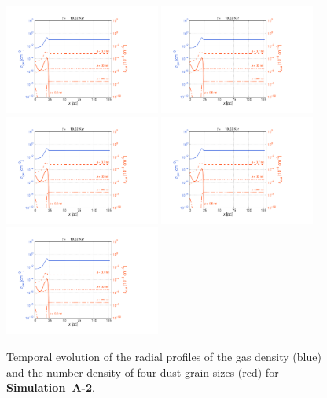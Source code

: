 \documentclass[fleqn,usenatbib]{mnras}
\begin{document}
  \begin{figure}
  \includegraphics[trim=2.4cm 1.5cm 9.0cm 2.0cm, clip=true,page=1,height = 3.6cm]{Pics/Pics_A2/Profile_dust.pdf}\hspace*{-0.05cm} 
  \includegraphics[trim=5.5cm 1.5cm 9.0cm 2.0cm, clip=true,page=2,height = 3.6cm]{Pics/Pics_A2/Profile_dust.pdf}\hspace*{-0.05cm} 
  \includegraphics[trim=5.5cm 1.5cm 9.0cm 2.0cm, clip=true,page=4,height = 3.6cm]{Pics/Pics_A2/Profile_dust.pdf}\hspace*{-0.05cm} 
  \includegraphics[trim=5.5cm 1.5cm 9.0cm 2.0cm, clip=true,page=5,height = 3.6cm]{Pics/Pics_A2/Profile_dust.pdf}\hspace*{-0.05cm} 
  \includegraphics[trim=5.5cm 1.5cm 6.0cm 2.0cm, clip=true,page=6,height = 3.6cm]{Pics/Pics_A2/Profile_dust.pdf}
  \caption{Temporal evolution of the radial profiles of the gas density (blue) and the number density of four dust grain sizes (red) for \textbf{Simulation~A-2}.}
   \label{fig_prof_A2} 
  \end{figure}   
  
\end{document}
